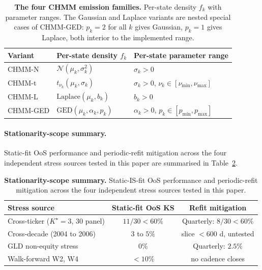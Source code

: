 \begin{table}[!ht]
\centering
\small
\caption{\textbf{The four CHMM emission families.} Per-state density $f_k$ with parameter ranges. The Gaussian and Laplace variants are nested special cases of CHMM-GED: $p_k = 2$ for all $k$ gives Gaussian, $p_k = 1$ gives Laplace, both interior to the implemented range.}
\label{tab:emission_families}
\begin{tabular}{l l l}
\toprule
Variant  & Per-state density $f_k$                & Per-state parameter range \\
\midrule
CHMM-N   & $\mathcal{N}(\mu_k, \sigma_k^2)$       & $\sigma_k > 0$ \\
CHMM-t   & $t_{\nu_k}(\mu_k, \sigma_k)$           & $\sigma_k > 0$, $\nu_k \in [\nu_{\min}, \nu_{\max}]$ \\
CHMM-L   & $\mathrm{Laplace}(\mu_k, b_k)$     & $b_k > 0$ \\
CHMM-GED & $\mathrm{GED}(\mu_k, \alpha_k, p_k)$   & $\alpha_k > 0$, $p_k \in [p_{\min}, p_{\max}]$ \\
\bottomrule
\end{tabular}
\end{table}

\paragraph{Stationarity-scope summary.}
Static-fit OoS performance and periodic-refit mitigation across the four independent stress sources tested in this paper are summarised in Table~\ref{tab:stationarity_scope}.
\begin{table}[!ht]
\centering
\small
\caption{\textbf{Stationarity-scope summary.} Static-IS-fit OoS performance and periodic-refit mitigation across the four independent stress sources tested in this paper.}
\label{tab:stationarity_scope}
\begin{tabular}{l c c}
\toprule
Stress source & Static-fit OoS KS & Refit mitigation \\
\midrule
Cross-ticker ($K^\star=3$, 30 panel) & $11/30 < 60\%$ & Quarterly: $8/30 < 60\%$ \\
Cross-decade (2004 to 2006) & $3$ to $5\%$ & slice $< 600$ d, untested \\
GLD non-equity stress & $0\%$ & Quarterly: $2.5\%$ \\
Walk-forward W2, W4 & $< 10\%$ & no cadence closes \\
\bottomrule
\end{tabular}
\end{table}
